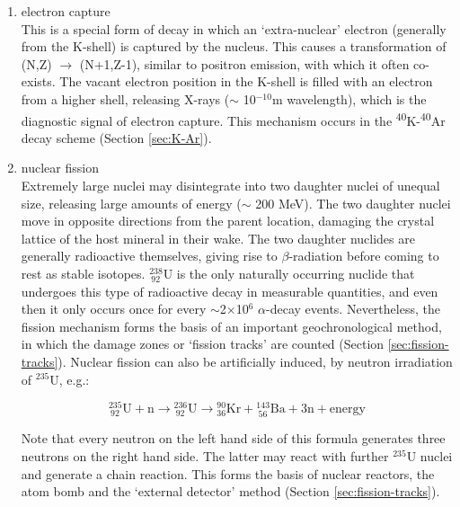 \documentclass{book}
\begin{document}
\begin{enumerate}
\item{electron capture}\\ This is a special form of decay in which an
  `extra-nuclear' electron (generally from the K-shell) is captured by
  the nucleus. This causes a transformation of (N,Z) $\rightarrow$
  (N+1,Z-1), similar to positron emission, with which it often
  co-exists. The vacant electron position in the K-shell is filled with
  an electron from a higher shell, releasing X-rays ($\sim$
  10$^{-10}$m wavelength), which is the diagnostic signal of electron
  capture. This mechanism occurs in the
  \textsuperscript{40}K-\textsuperscript{40}Ar decay scheme (Section
  \ref{sec:K-Ar}).

\item{nuclear fission}\\ Extremely large nuclei may disintegrate into
  two daughter nuclei of unequal size, releasing large amounts of
  energy ($\sim$ 200 MeV). The two daughter nuclei move in opposite
  directions from the parent location, damaging the crystal lattice of
  the host mineral in their wake. The two daughter nuclides are
  generally radioactive themselves, giving rise to $\beta$-radiation
  before coming to rest as stable isotopes.  $^{238}_{~92}$U is the
  only naturally occurring nuclide that undergoes this type of
  radioactive decay in measurable quantities, and even then it only
  occurs once for every $\sim$2$\times$10$^6$ $\alpha$-decay events.
  Nevertheless, the fission mechanism forms the basis of an important
  geochronological method, in which the damage zones or `fission
  tracks' are counted (Section \ref{sec:fission-tracks}). Nuclear
  fission can also be artificially induced, by neutron irradiation of
  $^{235}$U, e.g.:

\begin{equation}
{}^{235}_{~92}\mathrm{U} + \mathrm{n} \rightarrow
{}^{236}_{~92}\mathrm{U} \rightarrow {}^{90}_{36}\mathrm{Kr} +
{}^{143}_{~56}\mathrm{Ba} + 3\mathrm{n} + \mbox{energy}
\label{eq:235Ufission}
\end{equation}

Note that every neutron on the left hand side of this formula
generates three neutrons on the right hand side. The latter may react
with further $^{235}$U nuclei and generate a chain reaction. This
forms the basis of nuclear reactors, the atom bomb and the `external
detector' method (Section \ref{sec:fission-tracks}).

\end{enumerate}
\end{document}
